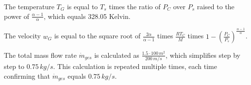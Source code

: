 The temperature \( T_G \) is equal to \( T_s \) times the ratio of \( P_C \) over \( P_s \) raised to the power of \( \frac{\alpha - 1}{\alpha} \), which equals 328.05 Kelvin.

The velocity \( w_G \) is equal to the square root of \( \frac{2 \alpha}{\alpha - 1} \) times \( \frac{R T_C}{M} \) times \( 1 - \left( \frac{P_C}{P_s} \right)^{\frac{\alpha - 1}{\alpha}} \).

The total mass flow rate \( \dot{m}_{ges} \) is calculated as \( \frac{1.5 \cdot 100 \, m^2}{200 \, m/s} \), which simplifies step by step to \( 0.75 \, kg/s \). This calculation is repeated multiple times, each time confirming that \( \dot{m}_{ges} \) equals \( 0.75 \, kg/s \).